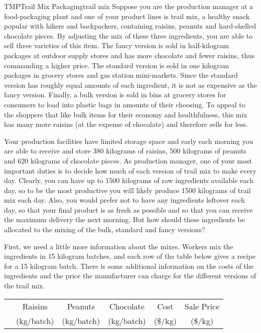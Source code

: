\begin{example}{TMP}{Trail Mix Packaging}{trail mix}
Suppose you are the production manager at a food-packaging plant and one of your product lines is trail mix, a healthy snack popular with hikers and backpackers, containing raisins, peanuts and hard-shelled chocolate pieces.  By adjusting the mix of these three ingredients, you are able to sell three varieties of this item.  The fancy version is sold in half-kilogram packages at outdoor supply stores and has more chocolate and fewer raisins, thus commanding a higher price.  The standard version is sold in one kilogram packages in grocery stores and gas station mini-markets.  Since the standard version has roughly equal amounts of each ingredient, it is not as expensive as the fancy version.  Finally, a bulk version is sold in bins at grocery stores for consumers to load into plastic bags in amounts of their choosing.  To appeal to the shoppers that like bulk items for their economy and healthfulness, this mix has many more raisins (at the expense of chocolate) and therefore sells for less.\par
%
Your production facilities have limited storage space and early each morning you are able to receive and store 380 kilograms of raisins, 500 kilograms of peanuts and 620 kilograms of chocolate pieces.  As production manager, one of your most important duties is to decide how much of each version of trail mix to make every day.  Clearly, you can have up to 1500 kilograms of raw ingredients available each day, so to be the most productive you will likely produce 1500 kilograms of trail mix each day.  Also, you would prefer not to have any ingredients leftover each day, so that your final product is as fresh as possible and so that you can receive the maximum delivery the next morning.  But how should these ingredients be allocated to the mixing of the bulk, standard and fancy versions?\par
%
First, we need a little more information about the mixes.  Workers mix the ingredients in 15 kilogram batches, and each row of the table below gives a recipe for a 15 kilogram batch.  There is some additional information on the costs of the ingredients and the price the manufacturer can charge for the different versions of the trail mix.\par
%
\begin{center}
\begin{tabular}{l*5{|c}}
&Raisins&Peanuts&Chocolate&Cost&Sale Price\\
&(kg/batch)&(kg/batch)&(kg/batch)&(\$/kg)&(\$/kg)\\\hline\hline

\end{tabular}
\end{center}
\end{example}

